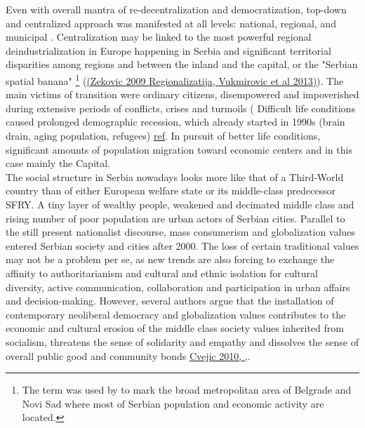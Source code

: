 \documentclass[11pt]{report}
\begin{document}
Even with overall mantra of re-decentralization and democratization, top-down and centralized approach was manifested at all levels: national, regional, and municipal \href{}{\citealt{vukmirovic_city_2013}}. Centralization may be linked to the most powerful regional deindustrialization in Europe happening in Serbia and significant territorial disparities among regions and between the inland and the capital, or the "Serbian spatial banana"
\footnote{The term was used by \href{}{\citealt{vujosevic_collapse_2010}}
to mark the broad metropolitan area of Belgrade and Novi Sad where most of Serbian population and economic activity are located.} (\href{}{(Zekovic 2009 Regionalizatija, Vukmirovic et al 2013)}).
The main victims of transition were ordinary citizens, disempowered and impoverished during extensive periods of conflicts, crises and turmoils (\href{}{\citealt{nedovic-budic_mornings_2011}}%
Difficult life conditions caused prolonged demographic recession, which already started in 1990s (brain drain, aging population, refugees) \href{}{ref}.
In pursuit of better life conditions, significant amounts of population migration toward economic centers and in this case mainly the Capital\href{}{\citealt{vukmirovic_city_2013}}.
\\

The social structure in Serbia nowadays looks more like that of a Third-World country than of either European welfare state or its middle-class predecessor SFRY.
A tiny layer of wealthy people, weakened and decimated middle class and rising number of poor population are urban actors of Serbian cities.
Parallel to the still present nationalist discourse, mass consumerism and globalization values entered Serbian society and cities after 2000.
The loss of certain traditional values may not be a problem per se, as new trends are also forcing to exchange the affinity to authoritarianism and cultural and ethnic isolation for cultural diversity, active communication, collaboration and participation in urban affairs and decision-making.
However, several authors argue that the installation of contemporary neoliberal democracy and globalization values contributes to the economic and cultural erosion of the middle class society values inherited from socialism, threatens the sense of solidarity and empathy and dissolves the sense of overall public good and community bonds \href{}{Cvejic 2010, } \href{}{\citealt{vukmirovic_city_2013}},\href{}{\citealt{ doytchinov_belgrade_2015}}.
\end{document}
